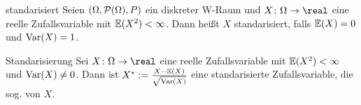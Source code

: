 \linie

\begin{Def}{standarisiert}
    Seien $(\Omega, \P(\Omega), P)$ ein diskreter W-Raum und
    $X\colon \Omega \rightarrow \real$ eine reelle Zufallsvariable mit $\EW(X^2) < \infty$.
    Dann heißt $X$ standarisiert, falls $\EW(X) = 0$ und $\Var(X) = 1$.
\end{Def}

\begin{Def}{Standarisierung}
    Sei $X\colon \Omega \rightarrow \real$ eine reelle Zufallsvariable mit $\EW(X^2) < \infty$
    und $\Var(X) \not= 0$.
    Dann ist $X^\ast := \frac{X - \EW(X)}{\sqrt{\Var(X)}}$ eine standarisierte Zufallsvariable,
    die sog.  von $X$.
\end{Def}

\pagebreak

